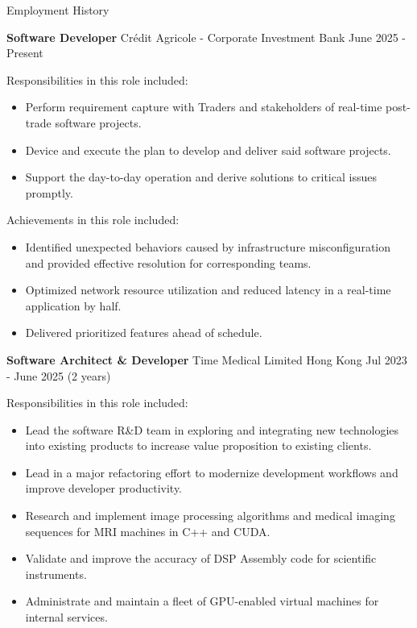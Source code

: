 \documentclass{resume} %
\begin{document}
\begin{rSection}{Employment History}
    \vspace{-1.25em}
    \item \textbf{Software Developer} {Crédit Agricole - Corporate Investment Bank}
    \hfill June 2025 - Present\\
    
    \hspace*{1cm}%
    \begin{minipage}{.8\textwidth}%
        Responsibilities in this role included:
        \begin{itemize}
            \item Perform requirement capture with Traders and stakeholders of real-time post-trade software projects.
            \item Device and execute the plan to develop and deliver said software projects.
            \item Support the day-to-day operation and derive solutions to critical issues promptly.
        \end{itemize}
        
        Achievements in this role included:
        \begin{itemize}
            \item Identified unexpected behaviors caused by infrastructure misconfiguration and provided effective resolution for corresponding teams.
            \item Optimized network resource utilization and reduced latency in a real-time application by half. 
            \item Delivered prioritized features ahead of schedule.
        \end{itemize}
    \end{minipage}%
    
    \item \textbf{Software Architect \& Developer} {Time Medical Limited Hong Kong}
    \hfill Jul 2023 - June 2025 (2 years)\\
    
    \hspace*{1cm}%
    \begin{minipage}{.8\textwidth}%
        Responsibilities in this role included:
        \begin{itemize}
            \item Lead the software R\&D team in exploring and integrating new technologies into existing products to increase value proposition to existing clients.
            \item Lead in a major refactoring effort to modernize development workflows and improve developer productivity.
            \item Research and implement image processing algorithms and medical imaging sequences for MRI machines in C++ and CUDA.
            \item Validate and improve the accuracy of DSP Assembly code for scientific instruments.
            \item Administrate and maintain a fleet of GPU-enabled virtual machines for internal services.
        \end{itemize}
        

\end{minipage}
\end{rSection}
\end{document}
